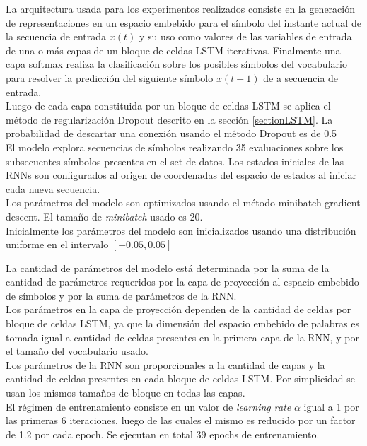 \documentclass{article}
\begin{document}
	La arquitectura usada para los experimentos realizados consiste en la generación de representaciones en un espacio embebido para el símbolo del instante actual de la secuencia de entrada $x(t)$ y su uso como valores de las variables de entrada de una o más capas de un bloque de celdas LSTM iterativas. Finalmente una capa softmax realiza la clasificación sobre los posibles símbolos del vocabulario para resolver la predicción del siguiente símbolo $x(t+1)$ de a secuencia de entrada.\\
	Luego de cada capa constituida por un bloque de celdas LSTM se aplica el método de regularización Dropout descrito en la sección \ref{sectionLSTM}. La probabilidad de descartar una conexión usando el método Dropout es de 0.5\\
	El modelo explora secuencias de símbolos realizando 35 evaluaciones sobre los subsecuentes símbolos presentes en el set de datos. Los estados iniciales de las RNNs son configurados al origen de coordenadas del espacio de estados al iniciar cada nueva secuencia.\\
	
	Los parámetros del modelo son optimizados usando el método minibatch gradient descent\cite{62MinibatchGradientDescent}. El tamaño de \textit{minibatch} usado es 20.\\
	Inicialmente los parámetros del modelo son inicializados usando una distribución uniforme en el intervalo $[-0.05, 0.05]$
	
	La cantidad de parámetros del modelo está determinada por la suma de la cantidad de parámetros requeridos por la capa de proyección al espacio embebido de símbolos y por la suma de parámetros de la RNN. \\
	Los parámetros en la capa de proyección dependen de la cantidad de celdas por bloque de celdas LSTM, ya que la dimensión del espacio embebido de palabras es tomada igual a cantidad de celdas presentes en la primera capa de la RNN, y por el tamaño del vocabulario usado.\\
	Los parámetros de la RNN son proporcionales a la cantidad de capas y la cantidad de celdas presentes en cada bloque de celdas LSTM. Por simplicidad se usan los mismos tamaños de bloque en todas las capas.\\
	
	El régimen de entrenamiento consiste en un valor de \textit{learning rate} $\alpha$ igual a 1 por las primeras 6 iteraciones, luego de las cuales el mismo es reducido por un factor de 1.2 por cada epoch. Se ejecutan en total 39 epochs de entrenamiento.\\
	
\end{document}
